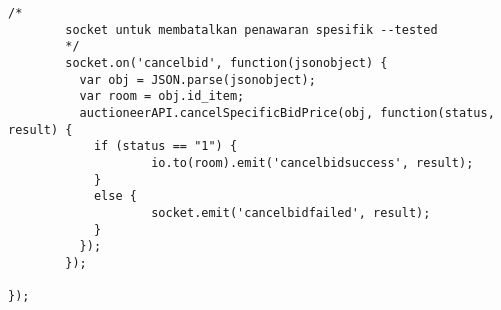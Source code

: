\begin{lstlisting}[label=sc-socket-bid,style=htmlcssjs,caption=Implementasi Node.js + Socket.io untuk Lelang]
        /*
        socket untuk membatalkan penawaran spesifik --tested
        */
        socket.on('cancelbid', function(jsonobject) {
          var obj = JSON.parse(jsonobject);
          var room = obj.id_item;
          auctioneerAPI.cancelSpecificBidPrice(obj, function(status, result) {
            if (status == "1") {
                    io.to(room).emit('cancelbidsuccess', result);
            }
            else {
                    socket.emit('cancelbidfailed', result);
            }
          });
        });

});

\end{lstlisting}